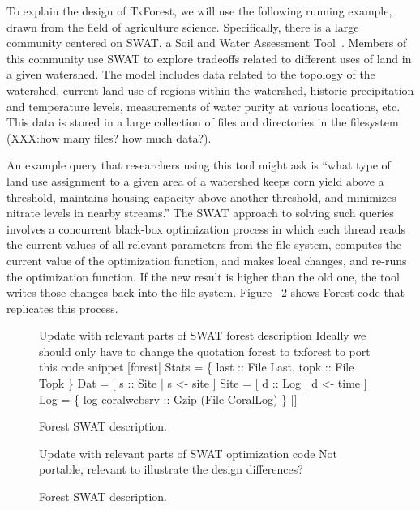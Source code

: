 To explain the design of TxForest, we will use the following running
example, drawn from the field of agriculture science.  Specifically,
there is a large community centered on SWAT, a Soil and Water
Assessment Tool~\cite{SWAT}.  Members of
this community use SWAT to explore tradeoffs related to different uses
of land in a given watershed.  The model includes data related to the
topology of the watershed, current land use of regions within the
watershed, historic precipitation and temperature levels, measurements
of water purity at various locations, etc.  This data is stored in a
large collection of files and directories in the filesystem (XXX:how
many files? how much data?).

An example query that researchers using this tool might ask is
``what type of land use assignment to a given area of a watershed
keeps corn yield above a threshold, maintains housing capacity above
another threshold, and minimizes nitrate levels in nearby streams.''
The SWAT approach to solving such queries involves a concurrent black-box
optimization process in which each thread reads the current values of
all relevant parameters from the file system, computes the current
value of the optimization function, and makes local changes, and re-runs
the optimization function. If the new result is higher than the old
one, the tool writes those changes back into the file system.  Figure
~\ref{fig:SWAT-opt-code} shows Forest code that replicates this process.

\begin{figure}
\begin{code}
Update with relevant parts of SWAT forest description   
Ideally we should only have to change the quotation
forest to txforest to port this code snippet
[forest|
  Stats = 
   \{ last :: File Last, topk :: File Topk \}
  Dat   = [ s :: Site | s <-  site ]
  Site  = [ d :: Log  | d <-  time ]
  Log = 
   \{ log  coralwebsrv :: Gzip (File CoralLog) \} |]
\end{code}
\caption{Forest SWAT description. }
\label{fig:SWAT-description}
\end{figure}

\begin{figure}
\begin{code}
Update with relevant parts of SWAT optimization code
Not portable, relevant to illustrate the design differences?
\end{code}
\caption{Forest SWAT description. }
\label{fig:SWAT-opt-code}
\end{figure}




